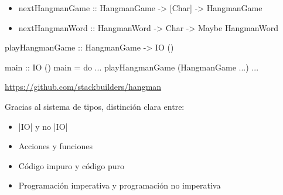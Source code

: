 \documentclass[spanish]{beamer}
\begin{document}

\begin{frame}[fragile]
  \begin{itemize}
  \item
    \begin{code}
nextHangmanGame :: HangmanGame
                -> [Char]
                -> HangmanGame
    \end{code}
  \item
    \begin{code}
nextHangmanWord :: HangmanWord
                -> Char
                -> Maybe HangmanWord
    \end{code}
  \end{itemize}
\end{frame}


\begin{frame}[fragile]
  \begin{code}
playHangmanGame :: HangmanGame -> IO ()
  \end{code}
\end{frame}


\begin{frame}[fragile]
  \begin{code}
main :: IO ()
main = do
  ...
  playHangmanGame (HangmanGame ...)
  ...
  \end{code}
\end{frame}


\begin{frame}
  \begin{center}
    \url{https://github.com/stackbuilders/hangman}
  \end{center}
\end{frame}


\begin{frame}[fragile]
  Gracias al sistema de tipos, distinción clara entre:
  \begin{itemize}
  \item |IO| y no |IO|
  \item Acciones y funciones
  \item Código impuro y código puro
  \item Programación imperativa y programación no imperativa
  \end{itemize}
\end{frame}
\end{document}
